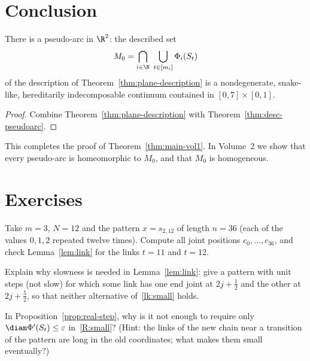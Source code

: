 
\section{Conclusion}

\begin{theorem}\label{thm:pseudoarc-exists}
There is a pseudo-arc in $\R^2$: the described set
\[
M_0=\bigcap_{i\in\N}\ \bigcup_{t\in[m_i]}\Phi_i(S_t)
\]
of the description of Theorem~\ref{thm:plane-description} is a nondegenerate, snake-like,
hereditarily indecomposable continuum contained in $[0,7]\times[0,1]$.
\end{theorem}

\begin{proof}
Combine Theorem~\ref{thm:plane-description} with Theorem~\ref{thm:desc-pseudoarc}.
\end{proof}


This completes the proof of Theorem~\ref{thm:main-vol1}. In Volume~2 we show that every pseudo-arc
is homeomorphic to $M_0$, and that $M_0$ is homogeneous.

\section*{Exercises}

\begin{exercise}
Take $m=3$, $N=12$ and the pattern $x=s_{2,12}$ of length $n=36$ (each of the values $0,1,2$
repeated twelve times). Compute all joint positions $c_0,\dots,c_{36}$, and check
Lemma~\ref{lem:link} for the links $t=11$ and $t=12$.
\end{exercise}

\begin{exercise}
Explain why slowness is needed in Lemma~\ref{lem:link}: give a pattern with unit steps (not
slow) for which some link has one end joint at $2j+\frac12$ and the other at $2j+\frac52$, so that
neither alternative of~\ref{lk:small} holds.
\end{exercise}

\begin{exercise}
In Proposition~\ref{prop:real-step}, why is it not enough to require only $\diam\Phi'(S_t)\le
\varepsilon$ in~\ref{R:small}? (Hint: the links of the new chain near a transition of the pattern
are long in the old coordinates; what makes them small eventually?)
\end{exercise}
